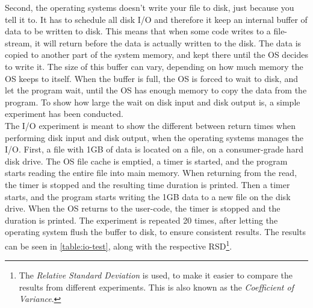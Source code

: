 \documentclass[a4paper]{article}
\begin{document}
Second, the operating systems doesn't write your file to disk, just because you tell it to. It has to schedule all disk I/O and therefore it keep an internal buffer of data to be written to disk. This means that when some code writes to a file-stream, it will return before the data is actually written to the disk. The data is copied to another part of the system memory, and kept there until the OS decides to write it. The size of this buffer can vary, depending on how much memory the OS keeps to itself. When the buffer is full, the OS is forced to wait to disk, and let the program wait, until the OS has enough memory to copy the data from the program. To show how large the wait on disk input and disk output is, a simple experiment has been conducted.\\

The I/O experiment is meant to show the different between return times when performing disk input and disk output, when the operating systems manages the I/O. First, a file with 1GB of data is located on a file, on a consumer-grade hard disk drive. The OS file cache is emptied, a timer is started, and the program starts reading the entire file into main memory. When returning from the read, the timer is stopped and the resulting time duration is printed. Then a timer starts, and the program starts writing the 1GB data to a new file on the disk drive. When the OS returns to the user-code, the timer is stopped and the duration is printed. The experiment is repeated 20 times, after letting the operating system flush the buffer to disk, to ensure consistent results. The results can be seen in \autoref{table:io-test}, along with the respective RSD\footnote{The \textit{Relative Standard Deviation} is used, to make it easier to compare the results from different experiments. This is also known as the \textit{Coefficient of Variance}.}.\\
\end{document}
